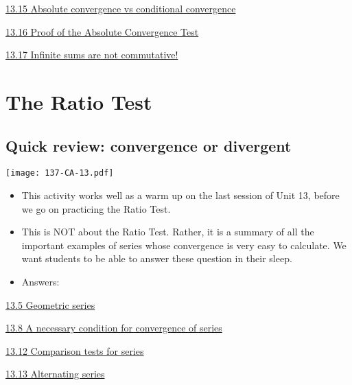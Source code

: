 \documentclass[11pt]{article}
\newcommand{\nl}{\hfill \vspace{-1.1\baselineskip}} %
\newcommand{\vv}{\hspace{8mm} \href{https://www.youtube.com/watch?v=IjTJP3ssOkk&list=PLlwePzQY_wW-FJMnD_ybkXU_jZLVtZttI&index=5}{13.5 Geometric series} }
\newcommand{\vviii}{\hspace{8mm} \href{https://www.youtube.com/watch?v=kP9qHkTSNpI&list=PLlwePzQY_wW-FJMnD_ybkXU_jZLVtZttI&index=8}{13.8 A necessary condition for convergence of series} }
\newcommand{\vxii}{\hspace{8mm} \href{https://www.youtube.com/watch?v=QbYK4COJUqU&list=PLlwePzQY_wW-FJMnD_ybkXU_jZLVtZttI&index=12}{13.12 Comparison tests for series} }
\newcommand{\vxiii}{\hspace{8mm} \href{https://www.youtube.com/watch?v=OM9U6Pwze8E&list=PLlwePzQY_wW-FJMnD_ybkXU_jZLVtZttI&index=13}{13.13 Alternating series} }
\newcommand{\vxv}{\hspace{8mm} \href{https://www.youtube.com/watch?v=2i0iUwLwwxs&list=PLlwePzQY_wW-FJMnD_ybkXU_jZLVtZttI&index=15}{13.15 Absolute convergence vs conditional convergence} }
\newcommand{\vxvi}{\hspace{8mm} \href{https://www.youtube.com/watch?v=_CSvVbH-0c0&list=PLlwePzQY_wW-FJMnD_ybkXU_jZLVtZttI&index=16}{13.16 Proof of the Absolute Convergence Test} }
\newcommand{\vxvii}{\hspace{8mm} \href{https://www.youtube.com/watch?v=H6f9mfqzeBg&list=PLlwePzQY_wW-FJMnD_ybkXU_jZLVtZttI&index=17}{13.17 Infinite sums are not commutative!} }
\begin{document}
\begin{videos}
\vxv

\vxvi

\vxvii
\end{videos}

\newpage
\section{The Ratio Test}
\subsection{Quick review: convergence or divergent}

\begin{center}
{ \texttt{[image: 137-CA-13.pdf]}} 
\end{center}

\begin{comments}
\nl
	\begin{itemize}
		\item This activity works well as a warm up on the last session of Unit 13, before we go on practicing the Ratio Test.
		\item   This is NOT about the Ratio Test.  Rather, it is a summary of all the important examples of series whose convergence is very easy to calculate.  We want students to be able to answer these question in their sleep.
		\item Answers:
			\begin{itemize}
			\end{itemize}
	\end{itemize}
\end{comments}

\begin{videos}
\vv

\vviii

\vxii

\vxiii
\end{videos}
\end{document}
